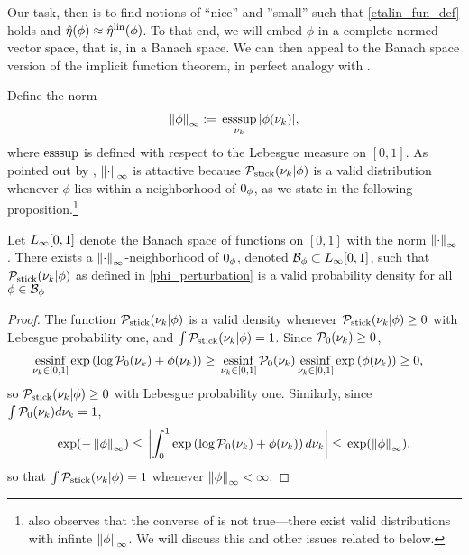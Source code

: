 Our task, then is to find notions of ``nice'' and ''small'' such that
\eqref{etalin_fun_def} holds and $\hat\eta(\phi) \approx \hat\eta^{\mathrm{lin}}(\phi)$. To that
end, we will embed $\phi$ in a complete normed vector space, that is, in a
Banach space.  We can then appeal to the Banach space version of the
implicit function theorem, in perfect analogy with .

Define the norm
%
\begin{align*}
%
\norminf{\phi} :={} \esssup_{\nuk} |\phi(\nuk)|,
%
\end{align*}
%
where $\operatorname*{\mathrm{esssup}}$ is defined with respect to the Lebesgue measure on $[0,1]$. As
pointed out by \citet{gustafson:1996:local}, $\left\Vert\cdot\right\Vert_{\infty}$ is attactive
because $\mathcal{P}_{\mathrm{stick}}(\nu_{k} \vert \phi)$ is a valid distribution whenever $\phi$ lies
within a neighborhood of $0_\phi$, as we state in the following
proposition.\footnote{\citet{gustafson:1996:local} also observes that the
converse of  is not true---there exist valid
distributions with infinte $\left\Vert\phi\right\Vert_{\infty}$.  We will discuss this and other
issues related to \citet{gustafson:1996:local} below.}

\begin{prop}
%
Let ${L_{\infty}[0,1]}$ denote the Banach space of functions on $[0,1]$ with the norm
$\left\Vert\cdot\right\Vert_{\infty}$ \citep[Theorem 5.2.1]{dudley:2018:real}.
There exists a $\left\Vert\cdot\right\Vert_{\infty}$-neighborhood of $0_\phi$, denoted $\mathcal{B}_\phi
\subset {L_{\infty}[0,1]}$, such that $\mathcal{P}_{\mathrm{stick}}(\nu_{k} \vert \phi)$ as defined in
\eqref{phi_perturbation} is a valid probability density for all $\phi \in
\mathcal{B}_\phi$
%
\begin{proof}
%
The function $\mathcal{P}_{\mathrm{stick}}(\nu_{k} \vert \phi)$ is a valid density whenever
$\mathcal{P}_{\mathrm{stick}}(\nu_{k} \vert \phi) \ge 0$ with Lebesgue probability one, and $\int
\mathcal{P}_{\mathrm{stick}}(\nu_{k} \vert \phi) = 1$. Since $\mathcal{P}_{0}(\nu_{k}) \ge 0$,
%
\begin{align*}
%
\essinf_{\nuk \in [0,1]} \exp\left(\log \pbase(\nuk) + \phi(\nuk)\right)
    \ge{}&
\essinf_{\nuk \in [0,1]} \pbase(\nuk)
\essinf_{\nuk \in [0,1]} \exp\left(\phi(\nuk)\right)
\ge{}0,
%
\end{align*}
%
so $\mathcal{P}_{\mathrm{stick}}(\nu_{k} \vert \phi) \ge 0$ with Lebesgue probability one. Similarly,
since $\int \mathcal{P}_{0}(\nu_{k}) d\nu_{k} = 1$,
%
\begin{align*}
%
\exp(-\norminf{\phi}) \le{}
\abs{\int_0^1 \exp\left(\log \pbase(\nuk) + \phi(\nuk)\right) d\nuk}
\le{}
\exp(\norminf{\phi}).
%
\end{align*}
%
so that $\int \mathcal{P}_{\mathrm{stick}}(\nu_{k} \vert \phi) = 1$ whenever $\left\Vert\phi\right\Vert_{\infty} < \infty$.
%
\end{proof}
%
\end{prop}


